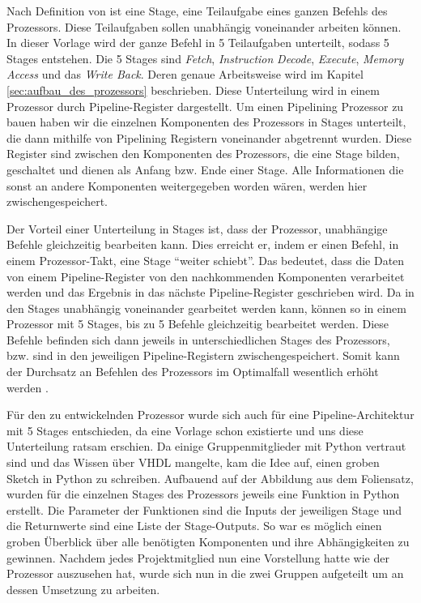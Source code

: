\documentclass[paper=a4,fontsize=11pt,twocolumn]{scrreprt}
\begin{document}
Nach Definition von \textcite{tanenbaum2006computerarchitektur} ist eine Stage, eine Teilaufgabe eines ganzen Befehls des Prozessors.
Diese Teilaufgaben sollen unabhängig voneinander arbeiten können.
In dieser Vorlage wird der ganze Befehl in 5 Teilaufgaben unterteilt, sodass 5 Stages entstehen.
Die 5 Stages sind \textit{Fetch}, \textit{Instruction} \textit{Decode}, \textit{Execute}, \textit{Memory Access} und das \textit{Write Back}.
Deren genaue Arbeitsweise wird im Kapitel \ref{sec:aufbau_des_prozessors} beschrieben.
Diese Unterteilung wird in einem Prozessor durch Pipeline-Register dargestellt.
Um einen Pipelining Prozessor zu bauen haben wir die einzelnen Komponenten des Prozessors in Stages unterteilt, die dann mithilfe von Pipelining Registern voneinander abgetrennt wurden.
Diese Register sind zwischen den Komponenten des Prozessors, die eine Stage bilden, geschaltet und dienen als Anfang bzw. Ende einer Stage.
Alle Informationen die sonst an andere Komponenten weitergegeben worden wären, werden hier zwischengespeichert.

Der Vorteil einer Unterteilung in Stages ist, dass der Prozessor, unabhängige Befehle gleichzeitig bearbeiten kann.
Dies erreicht er, indem er einen Befehl, in einem Prozessor-Takt, eine Stage \enquote{weiter schiebt}.
Das bedeutet, dass die Daten von einem Pipeline-Register von den nachkommenden Komponenten verarbeitet werden und das Ergebnis in das nächste Pipeline-Register geschrieben wird.
Da in den Stages unabhängig voneinander gearbeitet werden kann, können so in einem Prozessor mit 5 Stages, bis zu 5 Befehle gleichzeitig bearbeitet werden.
Diese Befehle befinden sich dann jeweils in unterschiedlichen Stages des Prozessors, bzw. sind in den jeweiligen Pipeline-Registern zwischengespeichert.
Somit kann der Durchsatz an Befehlen des Prozessors im Optimalfall wesentlich erhöht werden \autocite[]{rsvorlesung}.

Für den zu entwickelnden Prozessor wurde sich auch für eine Pipeline-Architektur mit 5 Stages entschieden, da eine Vorlage schon existierte und uns diese Unterteilung ratsam erschien.
Da einige Gruppenmitglieder mit Python vertraut sind und das Wissen über VHDL mangelte, kam die Idee auf, einen groben Sketch in Python zu schreiben.
Aufbauend auf der Abbildung aus dem Foliensatz, wurden für die einzelnen Stages des Prozessors jeweils eine Funktion in Python erstellt.
Die Parameter der Funktionen sind die Inputs der jeweiligen Stage und die Returnwerte sind eine Liste der Stage-Outputs.
So war es möglich einen groben Überblick über alle benötigten Komponenten und ihre Abhängigkeiten zu gewinnen.
Nachdem jedes Projektmitglied nun eine Vorstellung hatte wie der Prozessor auszusehen hat, wurde sich nun in die zwei Gruppen aufgeteilt um an dessen Umsetzung zu arbeiten.
\end{document}
